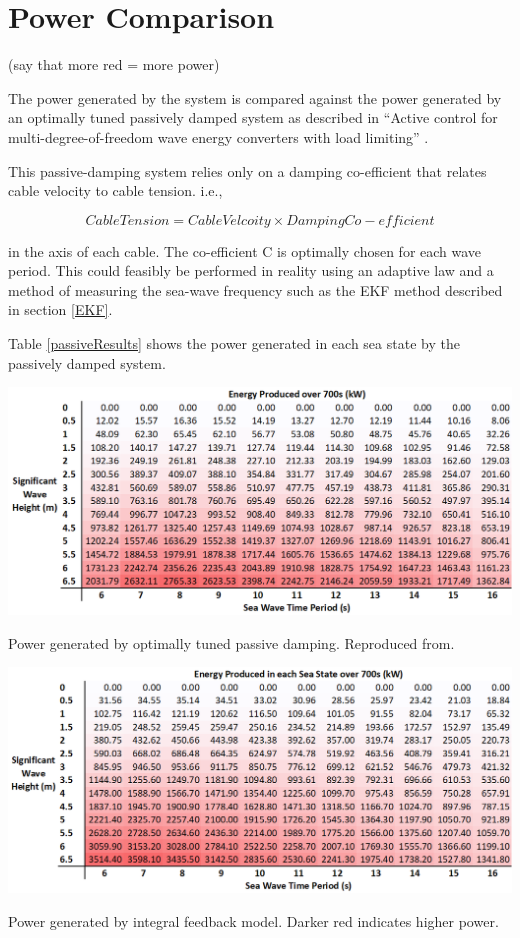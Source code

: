 \documentclass{report}
\begin{document}
\section{Power Comparison}
(say that more red = more power)

The power generated by the system is compared against the power generated by an optimally tuned passively damped system as described in ``Active control for multi-degree-of-freedom wave energy converters with load limiting'' \cite{AndyMPC}.

This passive-damping system relies only on a damping co-efficient that relates cable velocity to cable tension. i.e.,

\[
Cable Tension = Cable Velcoity \times Damping Co-efficient
\]

in the axis of each cable. The co-efficient C is optimally chosen for each wave period. This could feasibly be performed in reality using an adaptive law and a method of measuring the sea-wave frequency such as the EKF method described in section \ref{EKF}.

Table \ref{passiveResults} shows the power generated in each sea state by the passively damped system.

\begin{table}
\label{passiveResults}
\hspace{-3cm}
\includegraphics[scale=0.7]{tables/passiveResults}
\caption{Power generated by optimally tuned passive damping. Reproduced from\cite{andyMPC}.}
\end{table}

\begin{table}
\hspace{-3cm}
\includegraphics[scale=0.7]{tables/integralControlResults}
\caption{Power generated by integral feedback model. Darker red indicates higher power.}
\end{table}
\end{document}
